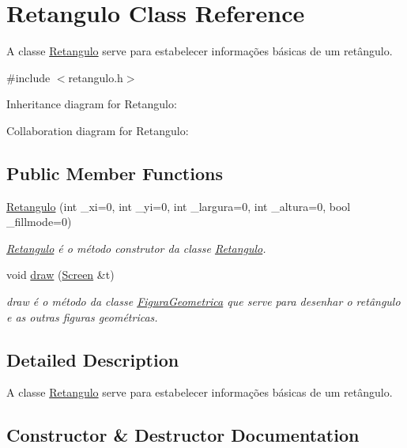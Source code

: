 \hypertarget{classRetangulo}{}\section{Retangulo Class Reference}
\label{classRetangulo}


A classe \hyperlink{classRetangulo}{Retangulo} serve para estabelecer informações básicas de um retângulo.  




{\ttfamily \#include $<$retangulo.\+h$>$}



Inheritance diagram for Retangulo\+:


Collaboration diagram for Retangulo\+:
\subsection*{Public Member Functions}
\begin{DoxyCompactItemize}
\item 
\hyperlink{classRetangulo_abec3c17c857a1b1d3da54934ee781d6b}{Retangulo} (int \+\_\+xi=0, int \+\_\+yi=0, int \+\_\+largura=0, int \+\_\+altura=0, bool \+\_\+fillmode=0)
\begin{DoxyCompactList}\small\item\em \hyperlink{classRetangulo}{Retangulo} é o método construtor da classe \hyperlink{classRetangulo}{Retangulo}. \end{DoxyCompactList}\item 
void \hyperlink{classRetangulo_ac088dd6d3f4f3d3f80363a868c2e74f1}{draw} (\hyperlink{classScreen}{Screen} \&t)
\begin{DoxyCompactList}\small\item\em draw é o método da classe \hyperlink{classFiguraGeometrica}{Figura\+Geometrica} que serve para desenhar o retângulo e as outras figuras geométricas. \end{DoxyCompactList}\end{DoxyCompactItemize}


\subsection{Detailed Description}
A classe \hyperlink{classRetangulo}{Retangulo} serve para estabelecer informações básicas de um retângulo. 

\subsection{Constructor \& Destructor Documentation}
\mbox{\label{classRetangulo_abec3c17c857a1b1d3da54934ee781d6b}} 
